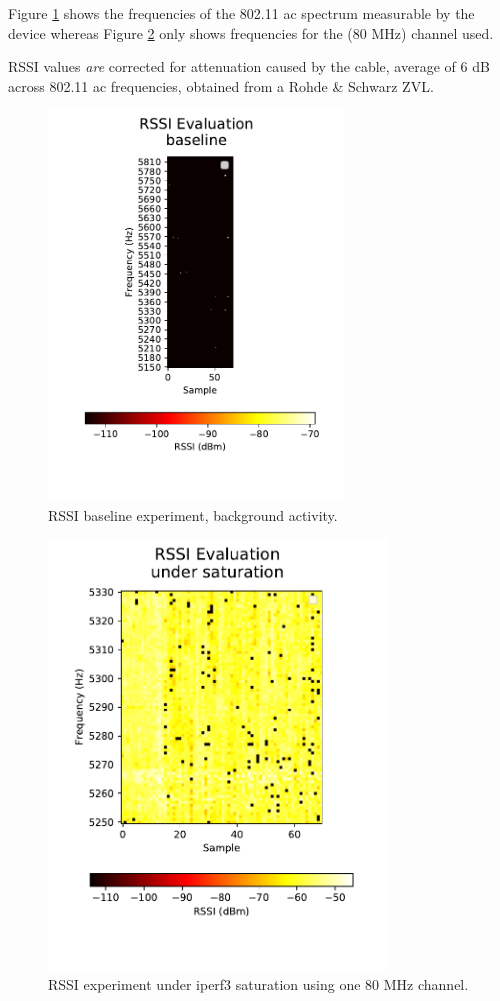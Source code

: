 Figure \ref{fig:rssiexpbaseline} shows the frequencies of the 802.11 ac
spectrum measurable by the device whereas Figure \ref{fig:rssiexpsat} only
shows frequencies for the (80 MHz) channel used.

RSSI values \emph{are} corrected for attenuation caused by the cable, average
of 6 dB across 802.11 ac frequencies, obtained from a Rohde \& Schwarz ZVL.

\begin{figure}[tbp]
  \centering
  \includegraphics[width=0.7\textwidth]{images/rssi_baseline.pdf}
  \caption{RSSI baseline experiment, background activity.}
  \label{fig:rssiexpbaseline}
\end{figure}

\begin{figure}[tbp]
  \centering
  \includegraphics[width=0.8\textwidth]{images/rssi_under_load.pdf}
  \caption{RSSI experiment under iperf3 saturation using one 80 MHz channel.}
  \label{fig:rssiexpsat}
\end{figure}
